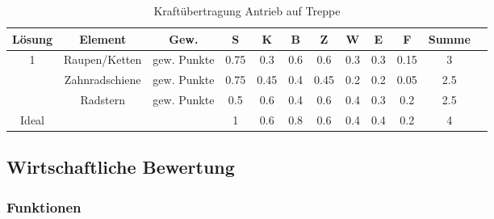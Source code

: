 \documentclass[10pt,a4paper]{article}
\begin{document}
\begin{table}[h!]
    \centering
    \begin{tabular}{cccccccccccc}
        \toprule
        \textbf{Lösung} & \textbf{Element} & \textbf{Gew.} & \textbf{S} & \textbf{K} & \textbf{B} & \textbf{Z} & \textbf{W} & \textbf{E} & \textbf{F} & \textbf{Summe} & \\
        \midrule
        1               & Raupen/Ketten    & gew. Punkte   & 0.75       & 0.3        & 0.6        & 0.6        & 0.3        & 0.3        & 0.15       & 3                \\
        \addlinespace
        2               & Zahnradschiene   & gew. Punkte   & 0.75       & 0.45       & 0.4        & 0.45       & 0.2        & 0.2        & 0.05       & 2.5              \\
        \addlinespace
        3               & Radstern         & gew. Punkte   & 0.5        & 0.6        & 0.4        & 0.6        & 0.4        & 0.3        & 0.2        & 2.5              \\
        \midrule
        Ideal           &                  &               & 1          & 0.6        & 0.8        & 0.6        & 0.4        & 0.4        & 0.2        & 4                \\
        \bottomrule
    \end{tabular}
    \caption{Kraftübertragung Antrieb auf Treppe}
    \label{tab:kraftuebertragung}
\end{table}
\FloatBarrier

\subsection{Wirtschaftliche Bewertung}
\subsubsection{Funktionen}
\end{document}
